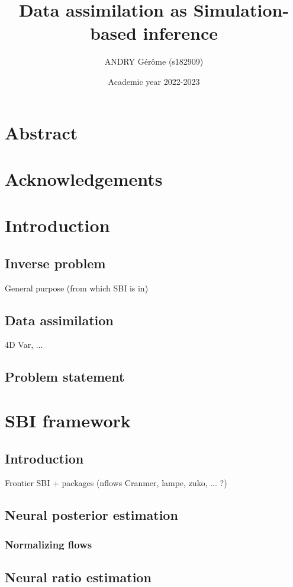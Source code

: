 \documentclass[a4paper, 12pt]{article}
\title{Data assimilation as Simulation-based inference}
\author{ANDRY Gérôme (s182909)}
\date{Academic year 2022-2023}
\begin{document}
\maketitle

\newpage
\section*{Abstract}


\newpage
\section*{Acknowledgements}

\newpage
\tableofcontents
\newpage


\section{Introduction}
\subsection{Inverse problem}
General purpose (from which SBI is in)
\subsection{Data assimilation}
4D Var, ... 
\subsection{Problem statement}

\section{SBI framework}
\subsection{Introduction}
Frontier SBI + packages (nflows Cranmer, lampe, zuko, ... ?)
\subsection{Neural posterior estimation}
\subsubsection{Normalizing flows}
\subsection{Neural ratio estimation}
\end{document}
